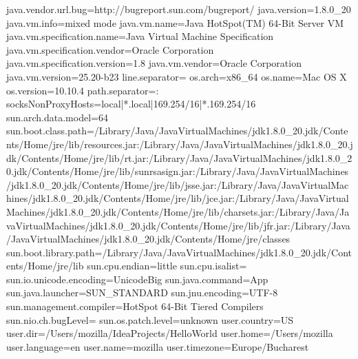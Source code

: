 java.vendor.url.bug=http://bugreport.sun.com/bugreport/
java.version=1.8.0_20
java.vm.info=mixed mode
java.vm.name=Java HotSpot(TM) 64-Bit Server VM
java.vm.specification.name=Java Virtual Machine Specification
java.vm.specification.vendor=Oracle Corporation
java.vm.specification.version=1.8
java.vm.vendor=Oracle Corporation
java.vm.version=25.20-b23
line.separator=\n
os.arch=x86_64
os.name=Mac OS X
os.version=10.10.4
path.separator=:
socksNonProxyHosts=local|*.local|169.254/16|*.169.254/16
sun.arch.data.model=64
sun.boot.class.path=/Library/Java/JavaVirtualMachines/jdk1.8.0_20.jdk/Contents/Home/jre/lib/resources.jar:/Library/Java/JavaVirtualMachines/jdk1.8.0_20.jdk/Contents/Home/jre/lib/rt.jar:/Library/Java/JavaVirtualMachines/jdk1.8.0_20.jdk/Contents/Home/jre/lib/sunrsasign.jar:/Library/Java/JavaVirtualMachines/jdk1.8.0_20.jdk/Contents/Home/jre/lib/jsse.jar:/Library/Java/JavaVirtualMachines/jdk1.8.0_20.jdk/Contents/Home/jre/lib/jce.jar:/Library/Java/JavaVirtualMachines/jdk1.8.0_20.jdk/Contents/Home/jre/lib/charsets.jar:/Library/Java/JavaVirtualMachines/jdk1.8.0_20.jdk/Contents/Home/jre/lib/jfr.jar:/Library/Java/JavaVirtualMachines/jdk1.8.0_20.jdk/Contents/Home/jre/classes
sun.boot.library.path=/Library/Java/JavaVirtualMachines/jdk1.8.0_20.jdk/Contents/Home/jre/lib
sun.cpu.endian=little
sun.cpu.isalist=
sun.io.unicode.encoding=UnicodeBig
sun.java.command=App
sun.java.launcher=SUN_STANDARD
sun.jnu.encoding=UTF-8
sun.management.compiler=HotSpot 64-Bit Tiered Compilers
sun.nio.ch.bugLevel=
sun.os.patch.level=unknown
user.country=US
user.dir=/Users/mozilla/IdeaProjects/HelloWorld
user.home=/Users/mozilla
user.language=en
user.name=mozilla
user.timezone=Europe/Bucharest
